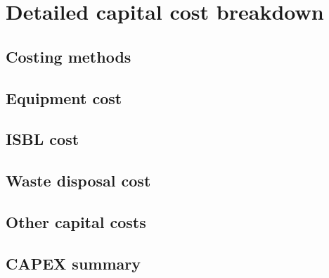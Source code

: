 \section{Detailed capital cost breakdown}
\subsection{Costing methods}
\subsection{Equipment cost}
\subsection{ISBL cost}
\subsection{Waste disposal cost}
\subsection{Other capital costs}
\subsection{CAPEX summary}